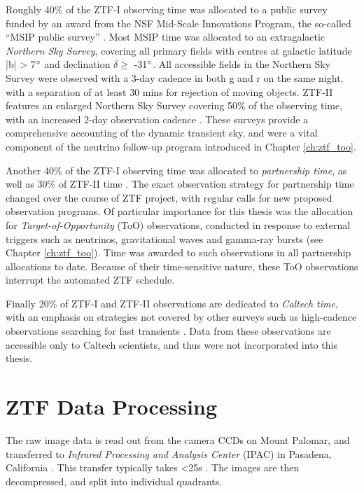 Roughly 40\% of the ZTF-I observing time was allocated to a public survey funded by an award from the NSF Mid-Scale Innovations Program, the so-called ``MSIP public survey'' \cite{ztf_survey_19}. Most MSIP time was allocated to an extragalactic \emph{Northern Sky Survey}, covering all primary fields with centres at galactic latitude |b| > 7$\mbox{$^\circ$}$ and declination $\delta \geq$ -31$\mbox{$^\circ$}$. All accessible fields in the Northern Sky Survey were observed with a 3-day cadence in both g and r on the same night, with a separation of at least 30 mins for rejection of moving objects. ZTF-II features an enlarged Northern Sky Survey covering 50\% of the observing time, with an increased 2-day observation cadence . These surveys provide a comprehensive accounting of the dynamic transient sky, and were a vital component of the neutrino follow-up program introduced in Chapter \ref{ch:ztf_too}.

Another 40\% of the ZTF-I observing time was allocated to \emph{partnership time}, as well as 30\% of ZTF-II time \cite{ztf_survey_19, ztfii_graham_20}. The exact observation strategy for partnership time changed over the course of ZTF project, with regular calls for new proposed observation programs. Of particular importance for this thesis was the allocation for \emph{Target-of-Opportunity} (ToO) observations, conducted in response to external triggers such as neutrinos, gravitational waves and gamma-ray bursts (see Chapter \ref{ch:ztf_too}). Time was awarded to such observations in all partnership allocations to date. Because of their time-sensitive nature, these ToO observations interrupt the automated ZTF schedule.

Finally 20\% of ZTF-I and ZTF-II observations are dedicated to \emph{Caltech time}, with an emphasis on strategies not covered by other surveys such as high-cadence observations searching for fast transients \cite{ztf_survey_19, ztfii_graham_20}. Data from these observations are accessible only to Caltech scientists, and thus were not incorporated into this thesis.

\section{ZTF Data Processing}

The raw image data is read out from the camera CCDs on Mount Palomar, and transferred to \emph{Infrared Processing and Analysis Center} (IPAC) in Pasadena, California . This transfer typically takes <25s \cite{ztf_system}. The images are then decompressed, and split into individual quadrants. 

